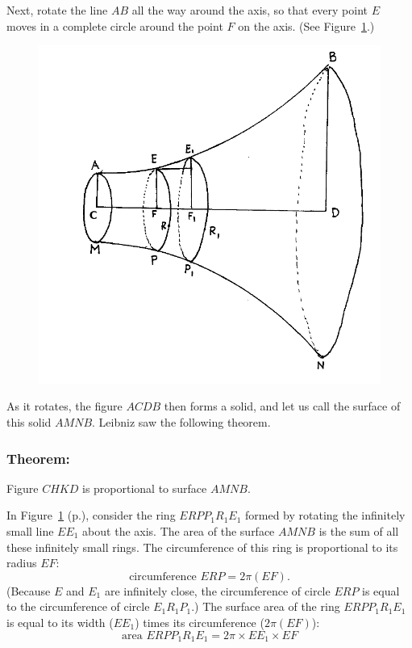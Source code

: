 \documentclass[polutonikogreek,english,twoside,openright]{article}
\begin{document}
Next, rotate the line $AB$ all the way around the axis, so that every
point $E$ moves in a complete circle around the point $F$ on the
axis. (See Figure~\ref{rotate}.)
\begin{figure}[ht]
\begin{center}
\includegraphics[width=\textwidth]{fig/Figure45a}
\caption{}
\label{rotate}
\vspace{-10pt}
\end{center}
\end{figure} As it rotates, the figure $ACDB$ then forms a solid, and
let us call the surface of this solid $AMNB$.  Leibniz saw the
following theorem.

\subsubsection*{Theorem:}

Figure $CHKD$ is proportional to surface $AMNB$.

\hspace{1ex}


In Figure~\ref{rotate} (p.\pageref{rotate}), consider the ring $ERPP_1R_1E_1$ formed by
rotating the infinitely small line $EE_1$ about the axis.  The area of
the surface $AMNB$ is the sum of all these infinitely small rings.
The circumference of this ring is proportional to its radius $EF$:
$$\mbox{circumference }ERP = 2\pi(EF).$$
(Because $E$ and $E_1$ are infinitely close, the circumference of
circle $ERP$ is equal to the circumference of circle $E_1R_1P_1$.)
The surface area of the ring $ERPP_1R_1E_1$ is equal to its width
($EE_1$) times its circumference ($2\pi (EF)$):
\setcounter{equation}{0}
\begin{equation}
\mbox{area }ERPP_1R_1E_1 = 2\pi \times EE_1 \times EF
\end{equation}
\end{document}

